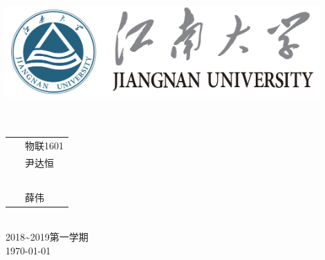 \documentclass[a4paper]{ctexrep}
\begin{document}
\begin{titlepage}
	\begin{center}
    \includegraphics[width=0.9\textwidth]{figure//Njust.png}\\
    \vspace{10mm}
    \textbf{}\\[0.8cm]
    \textbf{}\\[3cm]
	\vspace{\fill}
	\setlength{\extrarowheight}{3mm}
	{\songti{}	
		\begin{tabular}{rl}
			
			{\makebox[4\ccwd][s]{班\qquad 级：}}& ~\kaishu 物联1601\\
			
			{\makebox[4\ccwd][s]{姓\qquad 名：}}& ~\kaishu 尹达恒 \\ 
			
			{\makebox[4\ccwd][s]{学\qquad 号：}}& ~\kaishu 1030616134 \\ 
			
			{\makebox[4\ccwd][s]{指导老师：}} & ~\kaishu 薛伟\\ 
			
		\end{tabular}
	}\\[2cm]
	\vspace{\fill}
	2018\textasciitilde 2019第一学期\\
	\today
	\end{center}	
\end{titlepage}



\tableofcontents %
\end{document}
